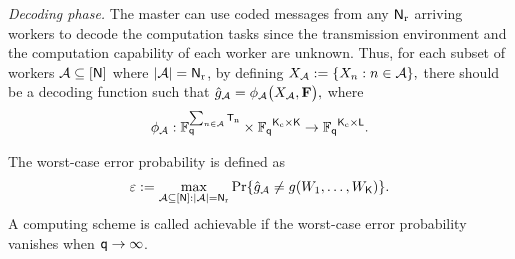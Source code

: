 \documentclass[conference,letterpaper]{IEEEtran}
\begin{document}
{\it Decoding phase.}
The master can use coded messages from any ${\sf N}_{\rm r}$ arriving workers to decode the computation tasks since the transmission environment and the computation capability of each worker are unknown. 
Thus, for each subset of workers ${\cal A} \subseteq [{\sf N}]$ where $|{\cal A}| = {\sf N}_{\rm r}$, by defining
$
    {X_{{\cal A}}}: = \{ {X_n}:n \in {\cal A}\}, 
$
there should be a decoding function such that 
$
\hat{g}_{{\cal A}}= \phi_{{\cal A}}\big( X_{{\cal A}}, {\bf F} \big),
$
where 
\begin{align}
    {\phi _{\cal A}}: \mathbb{F}_{{\sf q}}^{\sum_{n \in {\cal A}}{{\sf T}_{\rm n}}} \times {\mathbb{F}_{{\sf q}}}^{{{\sf K}_{\rm c}}\times {\sf K}} \to {\mathbb{F}_{{\sf q}}}^{{{\sf K}_{\rm c}}\times {\sf L}}.
\end{align}
    

The  worst-case error probability is defined as
\begin{align}
 \varepsilon:= \max_{{\cal A}  \subseteq [{\sf N}]: |{\cal A}|= {\sf N}_{\rm r}} \Pr\{ \hat{g}_{{\cal A}} \neq g(W_1,   \ldots, W_{{\sf K}}) \}. 
\end{align}
A computing scheme is called achievable if   the  worst-case     
error probability vanishes when ${\sf q} \to \infty$. 
\end{document}
